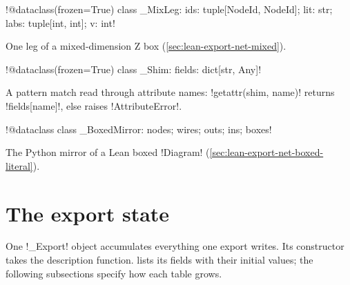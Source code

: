 {\begin{signature}
\py!@dataclass(frozen=True) class _MixLeg: ids: tuple[NodeId, NodeId]; lit: str; labs: tuple[int, int]; v: int!
\end{signature}
\noindent One leg of a mixed-dimension Z box (\cref{sec:lean-export-net-mixed}).

\begin{signature}
\py!@dataclass(frozen=True) class _Shim: fields: dict[str, Any]!
\end{signature}
\noindent A pattern match read through attribute names: \py!getattr(shim, name)! returns
\py!fields[name]!, else raises \py!AttributeError!.

\begin{signature}
\py!@dataclass class _BoxedMirror: nodes; wires; outs; ins; boxes!
\end{signature}
\noindent The Python mirror of a Lean boxed \lean!Diagram!
(\cref{sec:lean-export-net-boxed-literal}).

\section{The export state}\label{sec:lean-export-net-state}

One \py!_Export! object accumulates everything one export writes. Its constructor takes the
description function.  lists its fields with their initial
values; the following subsections specify how each table grows.

}
